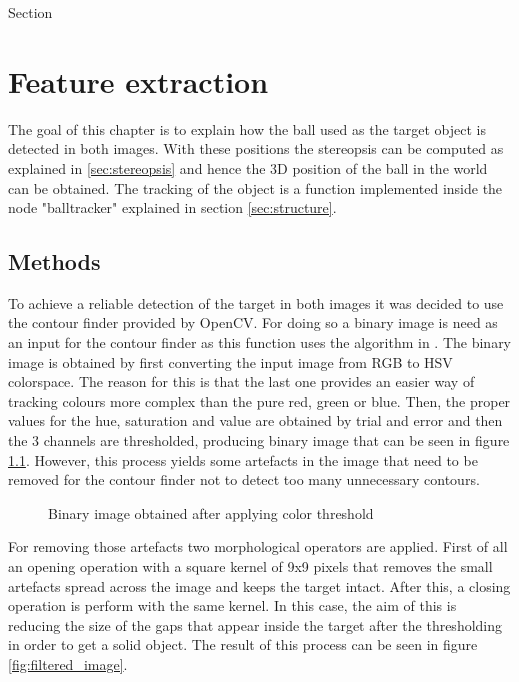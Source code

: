 Section\chapter{Feature extraction} %
\label{sec:feature_extraction}
The goal of this chapter is to explain how the ball used as the target object is detected in both images. With these positions the stereopsis can be computed as explained in \ref{sec:stereopsis} and hence the 3D position of the ball in the world can be obtained.
The tracking of the object is a function implemented inside the node "balltracker" explained in section \ref{sec:structure}.

\section{Methods}
To achieve a reliable detection of the target in both images it was decided to use the contour finder provided by OpenCV. For doing so a binary image is need as an input for the contour finder as this function uses the algorithm in \cite{suzuki}.
The binary image is obtained by first converting the input image from RGB to HSV colorspace. The reason for this is that the last one provides an easier way of tracking colours more complex than the pure red, green or blue. Then, the proper values for the hue, saturation and value are obtained by trial and error and then the 3 channels are thresholded, producing binary image that can be seen in figure \ref{fig:binary_image}. However, this process yields some artefacts in the image that need to be removed for the contour finder not to detect too many unnecessary contours.
 
\begin{figure}[h]
    \centering
    \caption{Binary image obtained after applying color threshold}
    \label{fig:binary_image}
\end{figure}

For removing those artefacts two morphological operators are applied. First of all an opening operation with a square kernel of 9x9 pixels that removes the small artefacts spread across the image and keeps the target intact. After this, a closing operation is perform with the same kernel. In this case, the aim of this is reducing the size of the gaps that appear inside the target after the thresholding in order to get a solid object. The result of this process can be seen in figure \ref{fig:filtered_image}.

